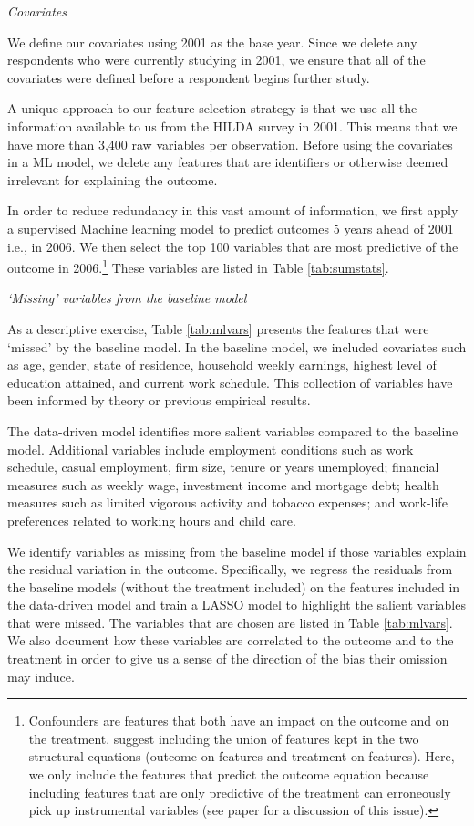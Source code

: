 \documentclass[12pt, a4paper]{article}
\begin{document}
\emph{Covariates}

We define our covariates using 2001 as the base year. Since we delete any respondents who were currently studying in 2001, we ensure that all of the covariates were defined before a respondent begins further study.

A unique approach to our feature selection strategy is that we use all the information available to us from the HILDA survey in 2001. This means that we have more than 3,400 raw variables per observation. Before using the covariates in a ML model, we delete any features that are identifiers or otherwise deemed irrelevant for explaining the outcome.

In order to reduce redundancy in this vast amount of information, we first apply a supervised Machine learning model to predict outcomes 5 years ahead of 2001 i.e., in 2006. We then select the top 100 variables that are most predictive of the outcome in 2006.\footnote{Confounders are features that both have an impact on the outcome and on the treatment. \cite{cherno2018} suggest including the union of features kept in the two structural equations (outcome on features and treatment on features). Here, we only include the features that predict the outcome equation because including features that are only predictive of the treatment can erroneously pick up instrumental variables (see \color{red} paper \color{black} for a discussion of this issue). } These variables are listed in Table \ref{tab:sumstats}. 

\emph{`Missing' variables from the baseline model}

As a descriptive exercise, Table \ref{tab:mlvars} presents the features that were ‘missed’ by the baseline model. In the baseline model, we included covariates such as age, gender, state of residence, household weekly earnings, highest level of education attained, and current work schedule. This collection of variables have been informed by theory or previous empirical results.  

The data-driven model identifies more salient variables compared to the baseline model. Additional variables include employment conditions such as work schedule, casual employment, firm size, tenure or years unemployed; financial measures such as weekly wage, investment income and mortgage debt; health measures such as limited vigorous activity and tobacco expenses; and work-life preferences related to working hours and child care. 

We identify variables as missing from the baseline model if those variables explain the residual variation in the outcome. Specifically, we regress the residuals from the baseline models (without the treatment included) on the features included in the data-driven model and train a LASSO model to highlight the salient variables that were missed. The variables that are chosen are listed in Table \ref{tab:mlvars}. We also document how these variables are correlated to the outcome and to the treatment in order to give us a sense of the direction of the bias their omission may induce. 
\end{document}
